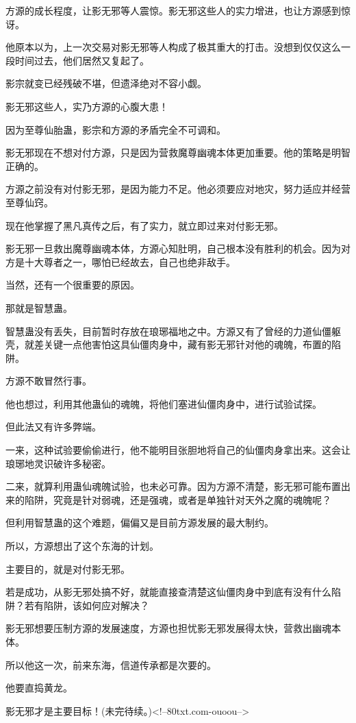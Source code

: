 \begin{this_body}
方源的成长程度，让影无邪等人震惊。影无邪这些人的实力增进，也让方源感到惊讶。

他原本以为，上一次交易对影无邪等人构成了极其重大的打击。没想到仅仅这么一段时间过去，他们居然又复起了。

影宗就变已经残破不堪，但遗泽绝对不容小觑。

影无邪这些人，实乃方源的心腹大患！

因为至尊仙胎蛊，影宗和方源的矛盾完全不可调和。

影无邪现在不想对付方源，只是因为营救魔尊幽魂本体更加重要。他的策略是明智正确的。

方源之前没有对付影无邪，是因为能力不足。他必须要应对地灾，努力适应并经营至尊仙窍。

现在他掌握了黑凡真传之后，有了实力，就立即过来对付影无邪。

影无邪一旦救出魔尊幽魂本体，方源心知肚明，自己根本没有胜利的机会。因为对方是十大尊者之一，哪怕已经故去，自己也绝非敌手。

当然，还有一个很重要的原因。

那就是智慧蛊。

智慧蛊没有丢失，目前暂时存放在琅琊福地之中。方源又有了曾经的力道仙僵躯壳，就差关键一点他害怕这具仙僵肉身中，藏有影无邪针对他的魂魄，布置的陷阱。

方源不敢冒然行事。

他也想过，利用其他蛊仙的魂魄，将他们塞进仙僵肉身中，进行试验试探。

但此法又有许多弊端。

一来，这种试验要偷偷进行，他不能明目张胆地将自己的仙僵肉身拿出来。这会让琅琊地灵识破许多秘密。

二来，就算利用蛊仙魂魄试验，也未必可靠。因为方源不清楚，影无邪可能布置出来的陷阱，究竟是针对弱魂，还是强魂，或者是单独针对天外之魔的魂魄呢？

但利用智慧蛊的这个难题，偏偏又是目前方源发展的最大制约。

所以，方源想出了这个东海的计划。

主要目的，就是对付影无邪。

若是成功，从影无邪处搞不好，就能直接查清楚这仙僵肉身中到底有没有什么陷阱？若有陷阱，该如何应对解决？

影无邪想要压制方源的发展速度，方源也担忧影无邪发展得太快，营救出幽魂本体。

所以他这一次，前来东海，信道传承都是次要的。

他要直捣黄龙。

影无邪才是主要目标！(未完待续。)<!--80txt.com-ouoou-->

\end{this_body}


